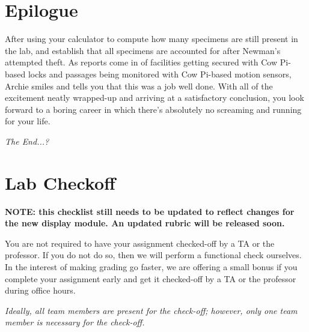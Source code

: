 \section*{Epilogue}

After using your calculator to compute how many specimens are still present in the lab, and establish that all specimens are accounted for after Newman's attempted theft.
As reports come in of facilities getting secured with Cow Pi-based locks and passages being monitored with Cow Pi-based motion sensors, Archie smiles and tells you that this was a job well done.
With all of the excitement neatly wrapped-up and arriving at a satisfactory conclusion, you look forward to a boring career in which there's absolutely no screaming and running for your life.

\textit{The End...?}

\newpage\appendix

\section{Lab Checkoff}

\textbf{NOTE: this checklist still needs to be updated to reflect changes for the new display module. An updated rubric will be released soon.}

You are not required to have your assignment checked-off by a TA or the
professor. If you do not do so, then we will perform a functional check
ourselves. In the interest of making grading go faster, we are offering a small
bonus %
if you complete your assignment early and get it checked-off by a TA or the
professor during office hours.

\textit{Ideally, all team members are present for the check-off; however, only
one team member is necessary for the check-off.}


